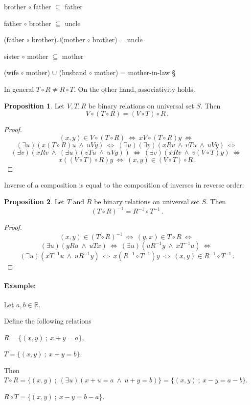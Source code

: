 \documentclass[11pt,paper=b5,footinclude,headinclude]{scrbook} %
\def\inn {{~\wedge~}}
\def\cee {{~\Leftrightarrow~}}
\def\zgled{\paragraph{Example:}}
\def\kz{{\hfill{\S}}}%
\theoremstyle{remark}
\theoremstyle{definition} %
\theoremstyle{theorem} %
\newtheorem*{proposition}{Proposition}
\begin{document}
\medskip

brother $\circ$ father $\subseteq$ father

father $\circ$ brother  $\subseteq$ uncle

(father $\circ$ brother)$\cup$(mother $\circ$ brother) = uncle

sister $\circ$ mother $\subseteq$  mother

(wife $\circ$ mother) $\cup$ (husband $\circ$ mother) = mother-in-law
\kz

\medskip
In general $T\circ R\neq R\circ T$. On the other hand, associativity holds.

\begin{proposition}
Let $V, T, R$ be binary relations on universal set $S$. Then
$$V\circ(T\circ R) = (V\circ T)\circ R\,.$$
\end{proposition}

\begin{proof}
$$(x,y)\in V\circ(T\circ R)\cee x V\circ(T\circ R) y
\cee$$
$$(\exists u)(x(T\circ R)u\inn uVy)
\cee (\exists u)(\exists v)(xRv\inn vTu\inn uVy)\cee $$
$$(\exists v)(xRv\inn (\exists u)(vTu\inn uVy))
\cee(\exists v)(xRv\inn v(V\circ T)y)\cee$$
$$x ((V\circ T)\circ R)y \cee (x,y)\in (V\circ T)\circ R\,.$$
\end{proof}

Inverse of a  composition is equal to the composition of inverses in reverse order:

\begin{proposition}
Let $T$ and $R$ be binary relations on universal set $S$. Then
$$(T\circ R)^{-1} = R^{-1}\circ T^{-1}\,.$$
\end{proposition}

\begin{proof}
$$(x,y)\in (T\circ R)^{-1} \cee (y,x)\in T\circ R
\cee$$
$$(\exists u)(yRu\inn uTx)
\cee (\exists u)(uR^{-1}y\inn xT^{-1}u)
\cee$$
$$(\exists u)(xT^{-1}u\inn uR^{-1}y)
\cee x (R^{-1}\circ T^{-1}) y\cee (x,y)\in R^{-1}\circ T^{-1}\,.$$
\end{proof}


\bigskip
\zgled

Let  $a,b\in\mathbb{R}$.

Define the following relations

$R = \{(x,y)~;~x+y = a\}$,

$T = \{(x,y)~;~x+y = b\}$.

Then
$T\circ R = \{(x,y)~;~(\exists u)(x+u = a\inn u+y = b)\}=\{(x,y)~;~x-y = a-b\}$.

$R\circ T = \{(x,y)~;~x-y = b-a\}$.
\end{document}

